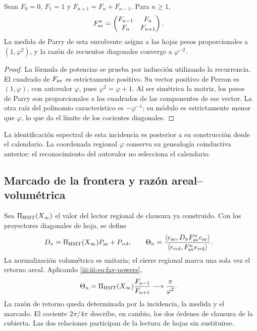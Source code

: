 \begin{proposition}
Sean $F_0=0$, $F_1=1$ y $F_{n+1}=F_n+F_{n-1}$. Para $n\geq1$,
\begin{equation}
 F_{\rm av}^{n}=
 \begin{pmatrix}F_{n-1}&F_n\\F_n&F_{n+1}\end{pmatrix}.
 \label{iii:iii:eq:fav-powers}
\end{equation}
La medida de Parry de esta envolvente asigna a las hojas pesos proporcionales
a $(1,\varphi^2)$, y la razón de recuentos diagonales converge a $\varphi^{-2}$.
\end{proposition}
\begin{proof}
La fórmula de potencias se prueba por inducción utilizando la recurrencia.
El cuadrado de $F_{\rm av}$ es estrictamente positivo. Su vector positivo de
Perron es $(1,\varphi)$, con autovalor $\varphi$, pues
$\varphi^2=\varphi+1$. Al ser simétrica la matriz, los pesos de Parry son
proporcionales a los cuadrados de las componentes de ese vector. La otra raíz
del polinomio característico es $-\varphi^{-1}$; su módulo es estrictamente
menor que $\varphi$, lo que da el límite de los cocientes diagonales.
\end{proof}

La identificación espectral de esta incidencia es posterior a su construcción
desde el calendario. La coordenada regional $\varphi$ conserva su genealogía
coinductiva anterior: el reconocimiento del autovalor no selecciona el calendario.

\subsection{Marcado de la frontera y razón areal--volumétrica}

Sea $\Pi_{\rm HMT}(X_\infty)$ el valor del lector regional de clausura ya
construido. Con los proyectores diagonales de hoja, se define
\begin{equation}
 D_\pi=\Pi_{\rm HMT}(X_\infty)P_{\rm ar}+P_{\rm vol},\qquad
 \Theta_n=
 \frac{\langle e_{\rm ar},D_\pi F_{\rm av}^{n}e_{\rm ar}\rangle}
 {\langle e_{\rm vol},F_{\rm av}^{n}e_{\rm vol}\rangle}.
 \label{iii:iii:eq:marked-return}
\end{equation}
La normalización volumétrica es unitaria; el cierre regional marca una sola vez
el retorno areal. Aplicando \eqref{iii:iii:eq:fav-powers},
\begin{equation}
 \Theta_n=\Pi_{\rm HMT}(X_\infty)\frac{F_{n-1}}{F_{n+1}}
 \longrightarrow\frac{\pi}{\varphi^2}.
 \label{iii:iii:eq:av-limit}
\end{equation}
La razón de retorno queda determinada por la incidencia, la medida y el marcado.
El cociente $2\pi/4\pi$ describe, en cambio, los dos órdenes de clausura de la
cubierta. Las dos relaciones participan de la lectura de hojas sin sustituirse.

